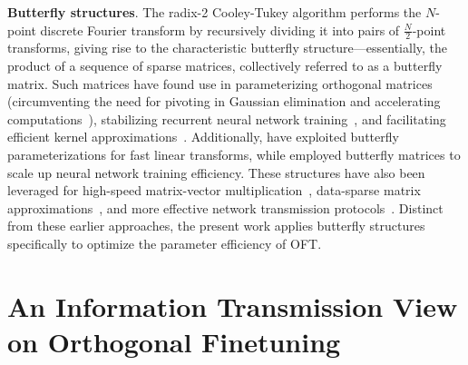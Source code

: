 \textbf{Butterfly structures}. The radix-2 Cooley-Tukey algorithm performs the $N$-point discrete Fourier transform by recursively dividing it into pairs of $\frac{N}{2}$-point transforms, giving rise to the characteristic butterfly structure—essentially, the product of a sequence of sparse matrices, collectively referred to as a butterfly matrix. Such matrices have found use in parameterizing orthogonal matrices (circumventing the need for pivoting in Gaussian elimination and accelerating computations~\cite{parker1995random}), stabilizing recurrent neural network training~\cite{jing2017tunable}, and facilitating efficient kernel approximations~\cite{munkhoeva2018quadrature}. Additionally, \cite{dao2019learning,dao2019kaleidoscope} have exploited butterfly parameterizations for fast linear transforms, while \cite{chen2022pixelated,dao2022monarch} employed butterfly matrices to scale up neural network training efficiency. These structures have also been leveraged for high-speed matrix-vector multiplication~\cite{michielssen1996multilevel,o2010algorithm}, data-sparse matrix approximations~\cite{li2015butterfly}, and more effective network transmission protocols~\cite{klasing1994broadcasting,li2003linear,rajasingh2016transmission}. Distinct from these earlier approaches, the present work applies butterfly structures specifically to optimize the parameter efficiency of OFT.

\section{An Information Transmission View on Orthogonal Finetuning}

